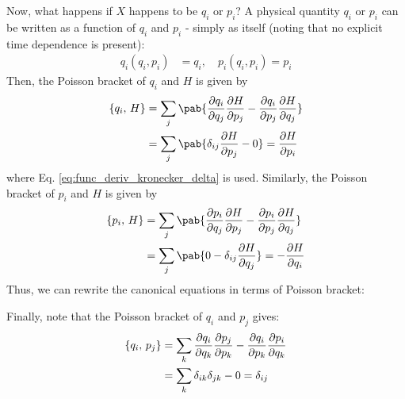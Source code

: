Now, what happens if $X$ happens to be $q_i$ or $p_i$?
A physical quantity $q_i$ or $p_i$ can be written as a function of $q_i$ and $p_i$ - simply as itself (noting that no explicit time dependence is present):
\begin{align}
  q_i(q_i, p_i) & = q_i, \quad p_i(q_i, p_i) = p_i
\end{align}
Then, the Poisson bracket of $q_i$ and $H$ is given by
\begin{align}
  \pobra{q_i}{H} & = \sum_j \pab{\pdv{q_i}{q_j} \pdv{H}{p_j} - \pdv{q_i}{p_j} \pdv{H}{q_j}} \\
                 & = \sum_j \pab{\delta_{ij} \pdv{H}{p_j} - 0} = \pdv{H}{p_i}
\end{align}
where Eq. \eqref{eq:func_deriv_kronecker_delta} is used.
Similarly, the Poisson bracket of $p_i$ and $H$ is given by
\begin{align}
  \pobra{p_i}{H} & = \sum_j \pab{\pdv{p_i}{q_j} \pdv{H}{p_j} - \pdv{p_i}{p_j} \pdv{H}{q_j}} \\
                 & = \sum_j \pab{0 - \delta_{ij} \pdv{H}{q_j}} = - \pdv{H}{q_i}
\end{align}
Thus, we can rewrite the canonical equations in terms of Poisson bracket:

Finally, note that the Poisson bracket of $q_i$ and $p_j$ gives:
\begin{align}
  \left\lbrace q_i ,\, p_j \right\rbrace & = \sum_k \pdv{q_i}{q_k} \pdv{p_j}{p_k} - \pdv{q_i}{p_k} \pdv{p_i}{q_k} \\
                   & = \sum_k \delta_{ik} \delta_{jk} - 0 = \delta_{ij}
\end{align}

